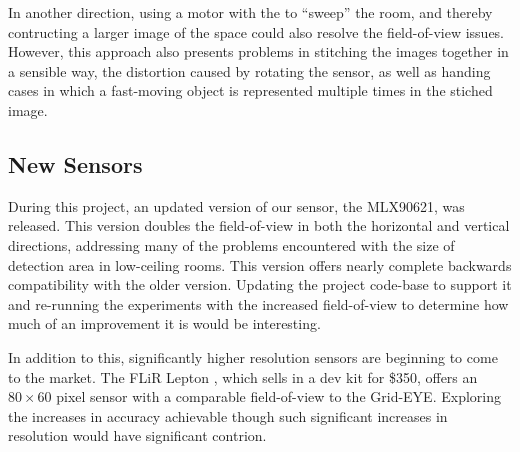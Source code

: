 \documentclass[../thesis/thesis.tex]{subfiles}
\begin{document}
In another direction, using a motor with the \mlx to ``sweep'' the room, and thereby contructing a larger image of the space could also resolve the field-of-view issues. However, this approach also presents problems in stitching the images together in a sensible way, the distortion caused by rotating the sensor, as well as handing cases in which a fast-moving object is represented multiple times in the stiched image.

\subsection{New Sensors}
During this project, an updated version of our sensor, the MLX90621, was released. This version doubles the field-of-view in both the horizontal and vertical directions, addressing many of the problems encountered with the size of detection area in low-ceiling rooms. This version offers nearly complete backwards compatibility with the older version. Updating the project code-base to support it and re-running the experiments with the increased field-of-view to determine how much of an improvement it is would be interesting.

In addition to this, significantly higher resolution sensors are beginning to come to the market. The FLiR Lepton \cite{flir}, which sells in a dev kit for \$350, offers an $80 \times 60$ pixel sensor with a comparable field-of-view to the Grid-EYE. Exploring the increases in accuracy achievable though such significant increases in resolution would have significant contrion.
 
\end{document}
